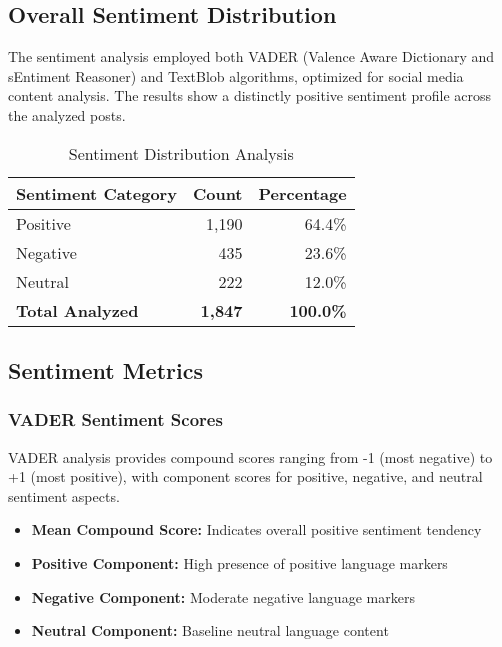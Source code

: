 \documentclass[12pt,a4paper]{article}
\begin{document}
\subsection{Overall Sentiment Distribution}

The sentiment analysis employed both VADER (Valence Aware Dictionary and sEntiment Reasoner) and TextBlob algorithms, optimized for social media content analysis. The results show a distinctly positive sentiment profile across the analyzed posts.

\begin{table}[h!]
\centering
\caption{Sentiment Distribution Analysis}
\begin{tabular}{@{}lrr@{}}
\toprule
\textbf{Sentiment Category} & \textbf{Count} & \textbf{Percentage} \\
\midrule
\textcolor{poscolor}{Positive} & 1,190 & 64.4\% \\
\textcolor{negcolor}{Negative} & 435 & 23.6\% \\
\textcolor{neucolor}{Neutral} & 222 & 12.0\% \\
\midrule
\textbf{Total Analyzed} & \textbf{1,847} & \textbf{100.0\%} \\
\bottomrule
\end{tabular}
\end{table}

\subsection{Sentiment Metrics}

\subsubsection{VADER Sentiment Scores}
VADER analysis provides compound scores ranging from -1 (most negative) to +1 (most positive), with component scores for positive, negative, and neutral sentiment aspects.

\begin{itemize}
    \item \textbf{Mean Compound Score:} Indicates overall positive sentiment tendency
    \item \textbf{Positive Component:} High presence of positive language markers
    \item \textbf{Negative Component:} Moderate negative language markers
    \item \textbf{Neutral Component:} Baseline neutral language content
\end{itemize}
\end{document}
